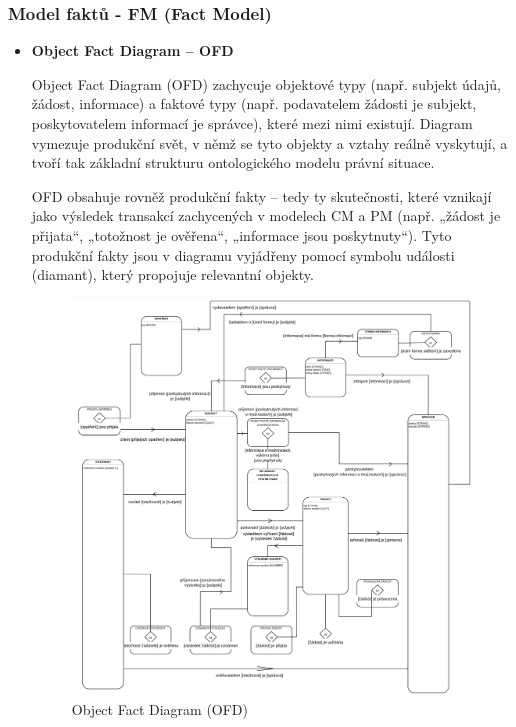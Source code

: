 \subsubsection{Model faktů - FM (Fact Model)}
\label{sec:demo-fm}
\begin{itemize}

  \item \textbf{Object Fact Diagram – OFD}

  Object Fact Diagram (OFD) zachycuje objektové typy (např. subjekt údajů, žádost, informace) a faktové typy (např. podavatelem žádosti je subjekt, poskytovatelem informací je správce), které mezi nimi existují. Diagram vymezuje produkční svět, v němž se tyto objekty a vztahy reálně vyskytují, a tvoří tak základní strukturu ontologického modelu právní situace.

  OFD obsahuje rovněž produkční fakty – tedy ty skutečnosti, které vznikají jako výsledek transakcí zachycených v modelech CM a PM (např. „žádost je přijata“, „totožnost je ověřena“, „informace jsou poskytnuty“). Tyto produkční fakty jsou v diagramu vyjádřeny pomocí symbolu události (diamant), který propojuje relevantní objekty.

  \begin{figure}[H]
    \centering
    \includegraphics[width=\textwidth]{images/demo_ofd.png}
    \caption{Object Fact Diagram (OFD)}
    \label{fig:demo_ofd}
  \end{figure}

\end{itemize}

